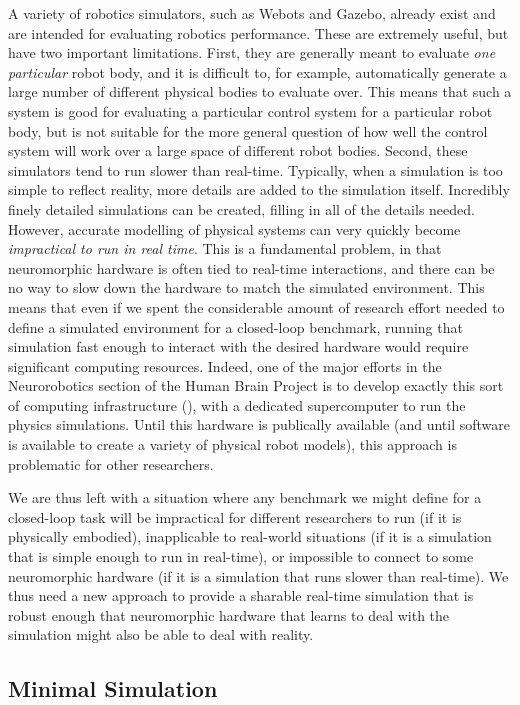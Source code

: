 \documentclass{frontiersSCNS} %
\begin{document}
A variety of robotics simulators, such as Webots and Gazebo, already exist
and are intended for evaluating robotics performance.  These are extremely
useful, but have two important limitations.  First, they are generally meant
to evaluate \emph{one particular} robot body, and it is difficult to, for
example, automatically generate a large number of different physical bodies 
to evaluate over.  This means that such a system is good for evaluating a
particular control system for a particular robot body, but is not suitable
for the more general question of how well the control system will work over
a large space of different robot bodies.  Second, these simulators tend
to run slower than real-time.  Typically, when a simulation is
too simple to reflect reality, more details are added to the simulation itself.
Incredibly finely detailed simulations can be created, filling in all of the
details needed.  However, accurate modelling of physical systems can very quickly
become \emph{impractical to run in real time}.
This is a fundamental problem, in that neuromorphic
hardware is often tied to real-time interactions, and there can be 
no way to slow down
the hardware to match the simulated environment.  This means that even if
we spent the considerable amount of research effort needed to define a
simulated environment for a closed-loop benchmark, running that simulation 
fast enough to interact with the desired hardware would require significant
computing resources.  Indeed, one of the major efforts in the Neurorobotics
section of the Human Brain Project is to develop exactly this sort of 
computing infrastructure (\citealt{HBProbot}), with a dedicated supercomputer to run the
physics simulations.  Until this hardware is publically available 
(and until software
is available to create a variety of physical robot models), this approach
is problematic for other researchers.

We are thus left with a situation where any benchmark we might define for
a closed-loop task will be impractical for different researchers to
run (if it is physically embodied), inapplicable to real-world situations
(if it is a simulation that is simple enough to run in real-time), or impossible to connect to
some neuromorphic hardware (if it is a simulation that runs slower than 
real-time).  We thus need a new approach to provide a sharable real-time
simulation that is robust enough that neuromorphic hardware that learns to
deal with the simulation might also be able to deal with reality.

\subsection{Minimal Simulation}
\end{document}
